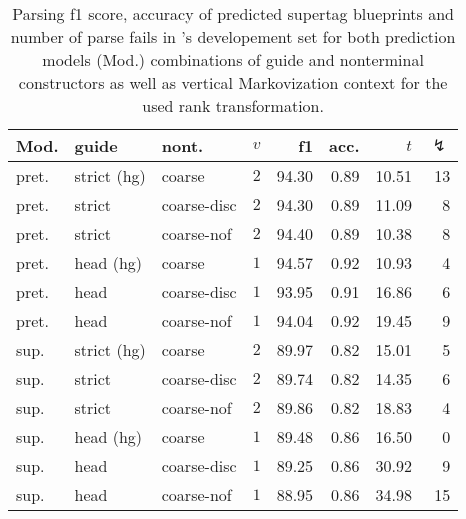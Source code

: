 \documentclass[../../document.tex]{subfiles}
\begin{document}
    \begin{table}
        \caption{\label{tbl:experiments:dptb:dcp}
        Parsing f1 score, accuracy of predicted  supertag blueprints and number of parse fails in 's developement set for both prediction models (Mod.) combinations of guide and nonterminal constructors as well as vertical Markovization context for the used rank transformation.
        }
        \centering
        \setlength{\tabcolsep}{4pt}
        \vspace{.2cm}
        \begin{tabular}{lllc|rrrr}
            \toprule
Mod. &  guide &   nont.   &\(v\)   & f1 & acc. & $t$ & $\lightning$ \\ \hline \rowcolor{black!10}
pret. & strict (hg) &  coarse & \(2\)  & 94.30 & 0.89 & 10.51 & 13  \\\hline
pret. & strict      &  coarse-disc  & \(2\)  & 94.30 & 0.89 & 11.09 & 8  \\
pret. & strict      &  coarse-nof & \(2\)  & 94.40 & 0.89 & 10.38 & 8  \\ \hline\rowcolor{black!10}
pret. & head  (hg)  &  coarse & \(1\)  & 94.57 & 0.92 & 10.93 & 4  \\\hline
pret. & head        &  coarse-disc & \(1\)  & 93.95 & 0.91 & 16.86 & 6  \\
pret. & head        &  coarse-nof & \(1\)  & 94.04 & 0.92 & 19.45 & 9  \\
\midrule \rowcolor{black!10}
sup. & strict (hg) &  coarse & \(2\)  & 89.97 & 0.82 & 15.01 & 5  \\\hline
sup. & strict    &  coarse-disc & \(2\)  & 89.74 & 0.82 & 14.35 & 6  \\
sup. & strict     &  coarse-nof & \(2\)  & 89.86 & 0.82 & 18.83 & 4  \\\hline\rowcolor{black!10}
sup. & head (hg)  &  coarse & \(1\)  & 89.48 & 0.86 & 16.50 & 0  \\\hline
sup. & head      &  coarse-disc & \(1\)  & 89.25 & 0.86 & 30.92 & 9  \\
sup. & head       &  coarse-nof & \(1\)  & 88.95 & 0.86 & 34.98 & 15  \\
    \bottomrule
        \end{tabular}
    \end{table}
\end{document}
